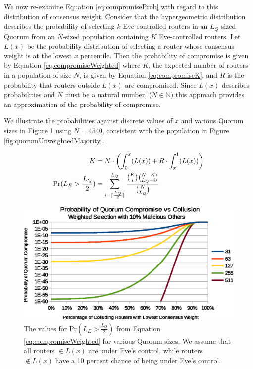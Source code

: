 \documentclass[conference]{IEEEtran}
\DeclarePairedDelimiter{\ceil}{\lceil}{\rceil}
\begin{document}
We now re-examine Equation \ref{eq:compromiseProb} with regard to this distribution of consensus weight. Consider that the hypergeometric distribution describes the probability of selecting $ k $ Eve-controlled routers in an $ L_{Q} $-sized Quorum from an $ N $-sized population containing $ K $ Eve-controlled routers. Let $ L(x) $ be the probability distribution of selecting a router whose consensus weight is at the lowest $ x $ percentile. Then the probability of compromise is given by Equation \ref{eq:compromiseWeighted} where $ K $, the expected number of routers in a population of size $ N $, is given by Equation \ref{eq:compromiseK}, and $ R $ is the probability that routers outside $ L(x) $ are compromised. Since $ L(x) $ describes probabilities and $ N $ must be a natural number, ($ N \in \mathbb{N} $) this approach provides an approximation of the probability of compromise.

We illustrate the probabilities against discrete values of $ x $ and various Quorum sizes in Figure \ref{fig:quorumWeightedMajority} using $ N = 4540 $, consistent with the population in Figure \ref{fig:quorumUnweightedMajority}.

\begin{align}
	K &= N \cdot \left( \int_0^x(L(x)) + R \cdot \int_x^1(L(x)) \right)
	\label{eq:compromiseK}
	\\
	\mathrm{Pr}(L_{E} > \frac{L_{Q}}{2}) &= \displaystyle\sum_{i=\ceil{\frac{L_{Q}}{2}}}^{L_{Q}} \frac{\binom{K}{i}\binom{N - K}{L_{Q} - i}}{\binom{N}{L_{Q}}}
	\label{eq:compromiseWeighted}
\end{align}

\begin{figure}[htbp]
	\centering
	\includegraphics[width=\linewidth]{../assets/analysis/QuorumSelectionWeighted10.eps}
	\caption{The values for $ \mathrm{Pr}(L_{E} > \frac{L_{Q}}{2}) $ from Equation \ref{eq:compromiseWeighted} for various Quorum sizes. We assume that all routers $ \in L(x) $ are under Eve's control, while routers $ \notin L(x) $ have a 10 percent chance of being under Eve's control.}
	\label{fig:quorumWeightedMajority}
\end{figure}
\end{document}
